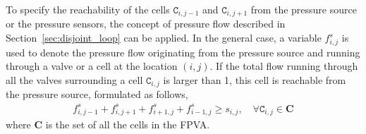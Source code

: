 To specify the reachability of the 
cells $\mathtt{C}_{i,j-1}$ and $\mathtt{C}_{i,j+1}$ from the pressure source or
the pressure sensors, 
the concept of pressure flow described in Section~\ref{sec:disjoint_loop} can
be applied.  
In the general case, a 
variable $f^s_{i,j}$ is used to denote the pressure flow
originating from the pressure source and running through a
valve or a cell at the location $(i,j)$. If the total flow running
through all the valves surrounding a cell $\mathtt{C}_{i,j}$ is larger than 1,
this cell is reachable from the pressure source, formulated as
follows,
\begin{align}
\label{eq:flow_on_cell_s}
f^{s}_{i,j-1}+ f^{s}_{i,j+1}+ f^{s}_{i+1,j}+ f^{s}_{i-1,j}
\ge s_{i,j}, \quad \forall \mathtt{C}_{i,j} \in \mathbf{C}
\end{align}
where $\mathbf{C}$ is the set of all the cells in the FPVA.


